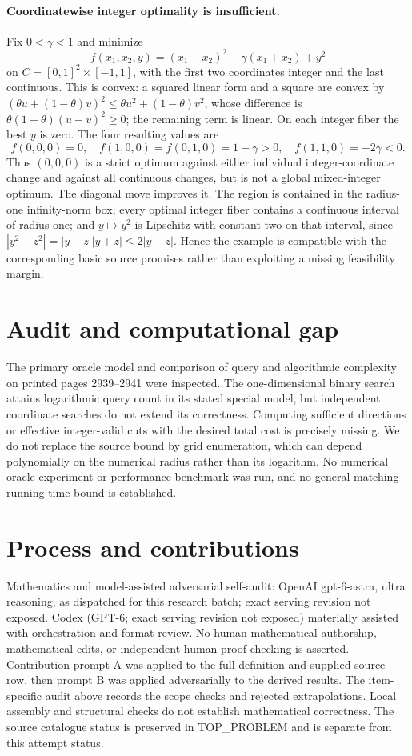 \documentclass[11pt]{article}
\begin{document}
\paragraph{Coordinatewise integer optimality is insufficient.}
Fix $0<\gamma<1$ and minimize
\[
f(x_1,x_2,y)=(x_1-x_2)^2-\gamma(x_1+x_2)+y^2
\]
on $C=[0,1]^2\times[-1,1]$, with the first two coordinates
integer and the last continuous. This is convex: a squared linear
form and a square are convex by
$(\theta u+(1-\theta)v)^2\le\theta u^2+(1-\theta)v^2$,
whose difference is $\theta(1-\theta)(u-v)^2\ge0$;
the remaining term is linear. On each integer fiber the best
$y$ is zero. The four resulting values are
\[
f(0,0,0)=0,\quad f(1,0,0)=f(0,1,0)=1-\gamma>0,
\quad f(1,1,0)=-2\gamma<0.
\]
Thus $(0,0,0)$ is a strict optimum against either individual
integer-coordinate change and against all continuous changes, but
is not a global mixed-integer optimum. The diagonal move improves it.
The region is contained in the radius-one infinity-norm box; every
optimal integer fiber contains a continuous interval of radius one;
and $y\mapsto y^2$ is Lipschitz with constant two on that
interval, since $|y^2-z^2|=|y-z||y+z|\le2|y-z|$.
Hence the example is compatible with the corresponding basic source
promises rather than exploiting a missing feasibility margin.

\section{Audit and computational gap}
The primary oracle model and comparison of query and algorithmic
complexity on printed pages 2939--2941 were inspected. The one-dimensional
binary search attains logarithmic query count in its stated special
model, but independent coordinate searches do not extend its correctness.
Computing sufficient directions or effective integer-valid cuts with
the desired total cost is precisely missing. We do not replace the
source bound by grid enumeration, which can depend polynomially on
the numerical radius rather than its logarithm. No numerical oracle
experiment or performance benchmark was run, and no general matching
running-time bound is established.

\section{Process and contributions}
Mathematics and model-assisted adversarial self-audit: OpenAI gpt-6-astra, ultra reasoning, as dispatched for this research batch; exact serving revision not exposed. Codex (GPT-6; exact serving revision not exposed) materially assisted with orchestration and format review. No human mathematical authorship, mathematical edits, or independent human proof checking is asserted.
Contribution prompt A was applied to the full definition and supplied source row, then prompt B was applied adversarially to the derived results. The item-specific audit above records the scope checks and rejected extrapolations. Local assembly and structural checks do not establish mathematical correctness. The source catalogue status is preserved in TOP\_PROBLEM and is separate from this attempt status.
\end{document}
